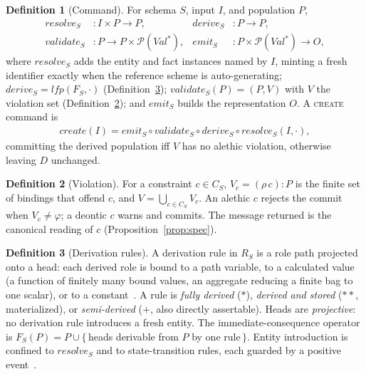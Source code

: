 \documentclass[10pt,twocolumn]{article}
\theoremstyle{plain}
\theoremstyle{definition}
\newtheorem{definition}{Definition}
\begin{document}
\begin{definition}[Command]\label{def:stages}
For schema $S$, input $I$, and population $P$,
\[
\begin{aligned}
\mathit{resolve}_S &: I\times P \to P, &
\mathit{derive}_S &: P\to P,\\
\mathit{validate}_S &: P\to P\times\mathcal{P}(\mathit{Val}^{*}), &
\mathit{emit}_S &: P\times\mathcal{P}(\mathit{Val}^{*})\to O,
\end{aligned}
\]
where $\mathit{resolve}_S$ adds the entity and fact instances named by $I$, minting a fresh identifier exactly when the reference scheme is auto-generating; $\mathit{derive}_S=\mathit{lfp}(F_S,\cdot)$ (Definition~\ref{def:derive}); $\mathit{validate}_S(P)=(P,V)$ with $V$ the violation set (Definition~\ref{def:violation}); and $\mathit{emit}_S$ builds the representation $O$. A \textsc{create} command is
\begin{align}
\mathit{create}(I)=\mathit{emit}_S\circ\mathit{validate}_S\circ\mathit{derive}_S\circ\mathit{resolve}_S(I,\cdot), \label{eq:create}
\end{align}
committing the derived population iff $V$ has no alethic violation, otherwise leaving $D$ unchanged.
\end{definition}

\begin{definition}[Violation]\label{def:violation}
For a constraint $c\in C_S$, $V_c=(\rho\,c)\!:\!P$ is the finite set of bindings that offend $c$, and $V=\bigcup_{c\in C_S}V_c$. An alethic $c$ rejects the commit when $V_c\neq\varphi$; a deontic $c$ warns and commits. The message returned is the canonical reading of $c$ (Proposition~\ref{prop:spec}).
\end{definition}

\begin{definition}[Derivation rules]\label{def:derive}
A derivation rule in $R_S$ is a role path projected onto a head: each derived role is bound to a path variable, to a calculated value (a function of finitely many bound values, an aggregate reducing a finite bag to one scalar), or to a constant~\cite{norma}. A rule is \emph{fully derived} ($*$), \emph{derived and stored} ($**$, materialized), or \emph{semi-derived} ($+$, also directly assertable). Heads are \emph{projective}: no derivation rule introduces a fresh entity. The immediate-consequence operator is $F_S(P)=P\cup\{\,$heads derivable from $P$ by one rule$\,\}$. Entity introduction is confined to $\mathit{resolve}_S$ and to state-transition rules, each guarded by a positive event~\cite{norma}.
\end{definition}
\end{document}
